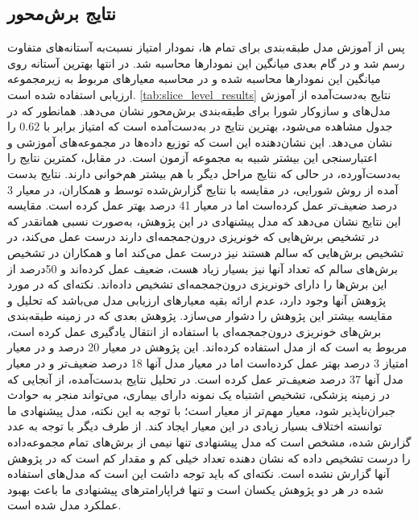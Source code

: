 \subsection{نتایج برش‌محور }
پس از آموزش مدل طبقه‌بندی برای تمام 
ها،
نمودار امتیاز
نسبت‌به آستانه‌های متفاوت رسم شد و در گام بعدی میانگین این نمودارها محاسبه شد. در انتها بهترین آستانه روی میانگین این نمودار‌ها محاسبه شده و در محاسبه معیارهای مربوط به زیرمجموعه ارزیابی استفاده شده است.
 \autoref{tab:slice_level_results}
  نتایج به‌دست‌آمده از آموزش مدل‌های  و سازوکار شورا برای طبقه‌بندی برش‌محور نشان می‌دهد. همانطور که در جدول مشاهده می‌شود، بهترین نتایج در
  به‌دست‌آمده است که امتیاز 
   برابر با
  $0.62$
 را نشان می‌دهد. این نشان‌دهنده این است که توزیع داده‌ها در مجموعه‌های آموزشی و اعتبارسنجی این 
  بیشتر شبیه به مجموعه آزمون است. در مقابل، 
   کمترین نتایج را به‌دست‌آورده، در حالی که نتایج مراحل دیگر با هم بیشتر هم‌خوانی دارند. نتایج بدست آمده از روش شورایی، در مقایسه با نتایج گزارش‌شده توسط
   \cite{hssayeni2020intracranial}
   و همکاران، در معیار
3 درصد ضعیف‌تر عمل کرده‌است اما در معیار
41 درصد بهتر عمل کرده است. مقایسه این نتایج نشان می‌دهد که مدل پیشنهادی در این پژوهش، به‌صورت نسبی همانقدر که در تشخیص برش‌هایی که خونریزی درون‌جمجمه‌ای دارند درست عمل می‌کند، در تشخیص برش‌هایی که سالم هستند نیز درست عمل می‌‌کند اما 
و همکاران در تشخیص برش‌های سالم که تعداد آنها نیز بسیار زیاد هست،‌ ضعیف عمل کرده‌اند و 50درصد از این برش‌ها را دارای خونریزی درون‌جمجمه‌ای تشخیص داده‌اند. نکته‌ای که در مورد پژوهش آنها وجود دارد،‌ عدم ارائه بقیه معیارهای ارزیابی مدل می‌باشد که تحلیل و مقایسه‌ بیشتر این پژوهش را دشوار می‌سازد.
پژوهش بعدی که در زمینه طبقه‌بندی برش‌های خونریزی درون‌جمجمه‌ای با استفاده از انتقال یادگیری عمل کرده است، مربوط به 
\cite{neethi2022stroke}
است که از مدل 
استفاده کرده‌اند. این پژوهش در معیار
20 درصد و در معیار امتیاز
3 درصد بهتر عمل کرده‌است اما در معیار 
مدل آنها 18 درصد ضعیف‌تر و در معیار 
مدل آنها 37 درصد ضعیف‌تر عمل کرده است. در تحلیل نتایج بدست‌آمده، از آنجایی که در زمینه پزشکی، تشخیص اشتباه یک نمونه دارای بیماری،‌ می‌تواند منجر به حوادث جبران‌ناپذیر شود، معیار 
مهم‌تر از معیار 
است؛ با توجه به این نکته،‌ مدل پیشنهادی ما توانسته اختلاف بسیار زیادی در این معیار ایجاد کند. از طرف دیگر با توجه به عدد 
گزارش شده، مشخص است که مدل پیشنهادی 
تنها نیمی از برش‌های تمام مجموعه‌داده را درست تشخیص داده که نشان دهنده تعداد خیلی کم 
و مقدار کم 
است که در پژوهش آنها گزارش نشده است. نکته‌ای که باید توجه داشت این است که مدل‌های استفاده شده در هر دو پژوهش یکسان است و تنها فراپارامتر‌های پیشنهادی ما باعث بهبود عملکرد مدل شده است.


